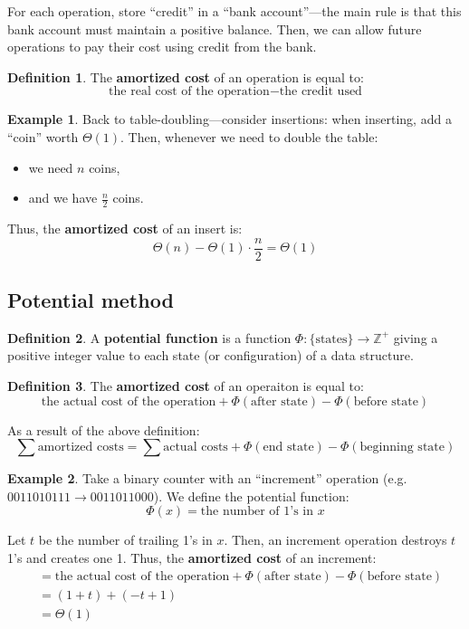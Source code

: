 \documentclass[11pt]{article}
\theoremstyle{plain}
\theoremstyle{definition}
\newtheorem*{defn}{Definition}
\newtheorem*{ex}{Example}
\newcommand{\Z}{\mathbb{Z}}
\begin{document}
For each operation, store ``credit'' in a ``bank account''---the main rule is that this bank account
must maintain a positive balance. Then, we can allow future operations to pay their cost using 
credit from the bank.

\begin{defn}
    The \textbf{amortized cost} of an operation is equal to:
    $$\text{the real cost of the operation} - \text{the credit used}$$
\end{defn}

\begin{ex}
    Back to table-doubling---consider insertions: when inserting, add a ``coin'' worth $\Theta(1)$.
    Then, whenever we need to double the table:
    \begin{itemize}
        \item we need $n$ coins,
        \item and we have $\frac{n}{2}$ coins.
    \end{itemize}
    Thus, the \textbf{amortized cost} of an insert is:
    $$\Theta(n) - \Theta(1) \cdot \frac{n}{2} = \Theta(1)$$
\end{ex}

\subsection{Potential method}

\begin{defn}
    A \textbf{potential function} is a function $\Phi: \{\text{states}\} \rightarrow \Z^+$ giving a
    positive integer value to each state (or configuration) of a data structure.
\end{defn}

\begin{defn}
    The \textbf{amortized cost} of an operaiton is equal to:
    $$\text{the actual cost of the operation} + \Phi(\text{after state}) - \Phi(\text{before state})$$
\end{defn}

As a result of the above definition:
$$\sum \text{amortized costs} = \sum \text{actual costs} + \Phi(\text{end state}) - \Phi(\text{beginning state})$$

\begin{ex}
    Take a binary counter with an ``increment'' operation 
    (e.g. $0011010111 \rightarrow 0011011000$). We define the potential function:
    $$\Phi(x) = \text{the number of 1's in } x$$
    
    Let $t$ be the number of trailing 1's in $x$. Then, an increment operation destroys $t$ 1's and 
    creates one 1. Thus, the \textbf{amortized cost} of an increment:
    \begin{align*}
        &= \text{the actual cost of the operation} + \Phi(\text{after state}) - \Phi(\text{before state})\\
        &= (1 + t) + (-t + 1)\\
        &= \Theta(1)
    \end{align*}
\end{ex}
\end{document}
